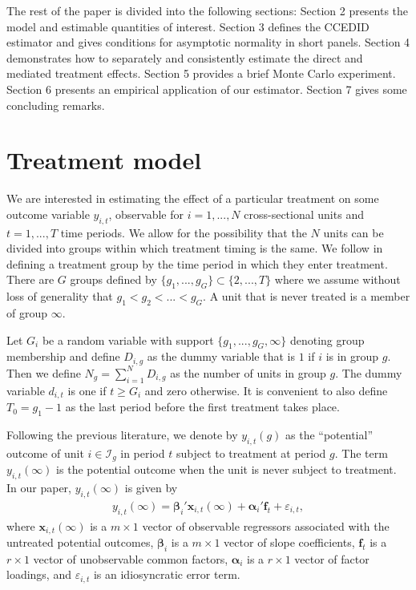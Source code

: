 \documentclass[12pt,fleqn]{article}
\def\*#1{\mathbf{#1}}
\def\+#1{\boldsymbol{#1}}
\begin{document}
The rest of the paper is divided into the following sections: Section 2 presents the model and estimable quantities of interest. Section 3 defines the CCEDID estimator and gives conditions for asymptotic normality in short panels. Section 4 demonstrates how to separately and consistently estimate the direct and mediated treatment effects. Section 5 provides a brief Monte Carlo experiment. Section 6 presents an empirical application of our estimator. Section 7 gives some concluding remarks.



\section{Treatment model}

We are interested in estimating the effect of a particular treatment on some outcome variable $y_{i,t}$, observable for $i=1,...,N$ cross-sectional units and $t=1,...,T$ time periods. We allow for the possibility that the $N$ units can be divided into groups within which treatment timing is the same. We follow \citet{Callaway_SantAnna_2020} in defining a treatment group by the time period in which they enter treatment. There are $G$ groups defined by $\{g_1,...,g_G\} \subset \{2,...,T\}$ where we assume without loss of generality that $g_1 < g_2 < ... < g_G$. A unit that is never treated is a member of group $\infty$.

Let $G_i$ be a random variable with support $\{g_1,...,g_G,\infty\}$ denoting group membership and define $D_{i,g}$ as the dummy variable that is $1$ if $i$ is in group $g$. Then we define $N_g = \sum_{i = 1}^N D_{i,g}$ as the number of units in group $g$. The dummy variable $d_{i,t}$ is one if $t \geq G_i$ and zero otherwise. It is convenient to also define $T_0 = g_1 - 1$ as the last period before the first treatment takes place.

Following the previous literature, we denote by $y_{i,t}(g)$ as the ``potential'' outcome of unit $i \in \mathcal{I}_g$ in period $t$ subject to treatment at period $g$. The term $y_{i,t}(\infty)$ is the potential outcome when the unit is never subject to treatment. In our paper, $y_{i,t}(\infty)$ is given by
\begin{align}
y_{i,t}(\infty) = \+\beta_i'\*x_{i,t}(\infty) +  \+\alpha_i'\*f_t + \varepsilon_{i,t},\label{y0}
\end{align}
where $\*x_{i,t}(\infty)$ is a $m\times 1$ vector of observable regressors associated with the untreated potential outcomes, $\+\beta_i$ is a $m\times 1$ vector of slope coefficients, $\*f_t$ is a $r \times 1$ vector of unobservable common factors, $\+\alpha_i$ is a $r\times 1$ vector of factor loadings, and $\varepsilon_{i,t}$ is an idiosyncratic error term.
\end{document}
